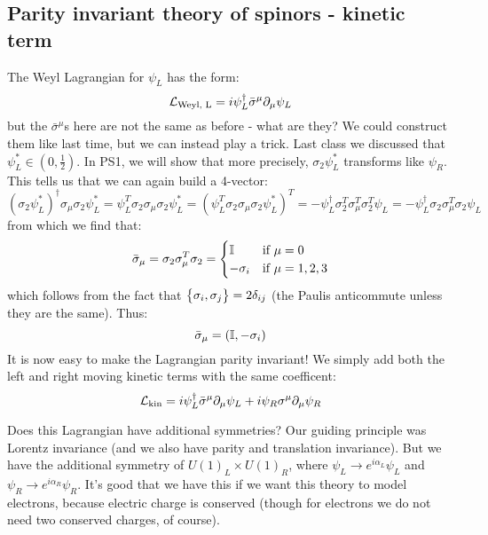 \subsection{Parity invariant theory of spinors - kinetic term}
The Weyl Lagrangian for $\psi_L$ has the form:
\begin{equation}
    \mathcal{L}_{\text{Weyl, L}} = i\psi^\dagger_L \bar{\sigma}^\mu \partial_\mu \psi_L
\end{equation}
but the $\bar{\sigma}^\mu$s here are not the same as before - what are they? We could construct them like last time, but we can instead play a trick. Last class we discussed that $\psi_L^* \in (0, \frac{1}{2})$. In PS1, we will show that more precisely, $\sigma_2\psi_L^*$ transforms like $\psi_R$. This tells us that we can again build a 4-vector:
\begin{equation}
    (\sigma_2\psi_L^*)^\dag \sigma_\mu \sigma_2 \psi_L^* = \psi_L^T\sigma_2\sigma_\mu\sigma_2\psi_L^* = (\psi_L^T \sigma_2 \sigma_\mu \sigma_2 \psi_L^*)^T = -\psi_L^\dag \sigma_2^T\sigma_\mu^T\sigma_2^T\psi_L = -\psi_L^\dag \sigma_2\sigma_\mu^T\sigma_2\psi_L
\end{equation}
from which we find that:
\begin{equation}
    \bar{\sigma}_\mu = \sigma_2\sigma_\mu^T\sigma_2 = \begin{cases}
        \mathbb{I} & \text{if $\mu = 0$}
        \\ -\sigma_i & \text{if $\mu = 1, 2, 3$}
    \end{cases}
\end{equation}
which follows from the fact that $\set{\sigma_i, \sigma_j} = 2\delta_{ij}$ (the Paulis anticommute unless they are the same). Thus:
\begin{equation}
    \bar{\sigma}_\mu = (\mathbb{I}, -\sigma_i)
\end{equation}
It is now easy to make the Lagrangian parity invariant! We simply add both the left and right moving kinetic terms with the same coefficent:
\begin{equation}
    \mathcal{L}_{\text{kin}} = i\psi_L^\dagger \bar{\sigma}^\mu \partial_\mu \psi_L + i\psi_R\sigma^\mu \partial_\mu \psi_R
\end{equation}

Does this Lagrangian have additional symmetries? Our guiding principle was Lorentz invariance (and we also have parity and translation invariance). But we have the additional symmetry of $U(1)_L \times U(1)_R$, where $\psi_L \to e^{i\alpha_L}\psi_L$ and $\psi_R \to e^{i\alpha_R}\psi_R$. It's good that we have this if we want this theory to model electrons, because electric charge is conserved (though for electrons we do not need two conserved charges, of course).

